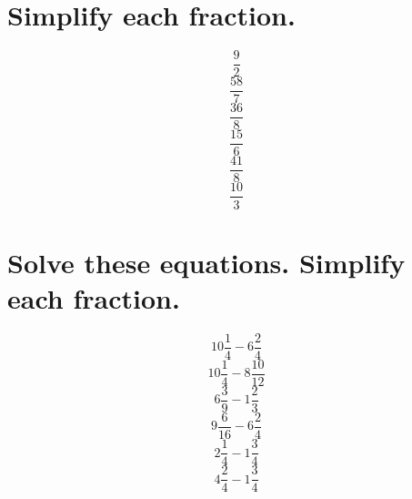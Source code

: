 \documentclass[12pt, fleqn, leqno]{article}
\begin{document}
    \section*{Simplify each fraction.}
\thispagestyle{plain}
        \begin{equation}\frac{9}{2}\end{equation}
        \vspace{4cm}
        \begin{equation}\frac{58}{7}\end{equation}
        \vspace{4cm}
        \begin{equation}\frac{36}{8}\end{equation}
        \vspace{4cm}
        \begin{equation}\frac{15}{6}\end{equation}
        \vspace{4cm}
        \begin{equation}\frac{41}{8}\end{equation}
        \vspace{4cm}
        \begin{equation}\frac{10}{3}\end{equation}
        \vspace{4cm}
\newpage
\section*{Solve these equations. Simplify each fraction.}
\thispagestyle{plain}
        \begin{equation}10\frac{1}{4} - 6\frac{2}{4}\end{equation}
        \vspace{4cm}
        \begin{equation}10\frac{1}{4} - 8\frac{10}{12}\end{equation}
        \vspace{4cm}
        \begin{equation}6\frac{3}{9} - 1\frac{2}{3}\end{equation}
        \vspace{4cm}
        \begin{equation}9\frac{6}{16} - 6\frac{2}{4}\end{equation}
        \vspace{4cm}
        \begin{equation}2\frac{1}{4} - 1\frac{3}{4}\end{equation}
        \vspace{4cm}
        \begin{equation}4\frac{2}{4} - 1\frac{3}{4}\end{equation}
        \vspace{4cm}
\newpage
\end{document}
